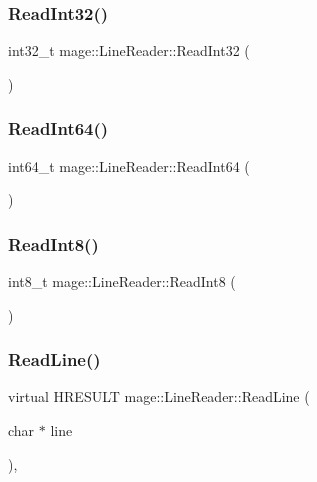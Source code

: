 \subsubsection{\texorpdfstring{Read\+Int32()}{ReadInt32()}}
{\footnotesize\ttfamily int32\+\_\+t mage\+::\+Line\+Reader\+::\+Read\+Int32 (\begin{DoxyParamCaption}{ }\end{DoxyParamCaption})\hspace{0.3cm}{\ttfamily [protected]}}

\hypertarget{classmage_1_1_line_reader_af78e657c17cfff3bfc5fed42fbc47085}{}\label{classmage_1_1_line_reader_af78e657c17cfff3bfc5fed42fbc47085} 
\subsubsection{\texorpdfstring{Read\+Int64()}{ReadInt64()}}
{\footnotesize\ttfamily int64\+\_\+t mage\+::\+Line\+Reader\+::\+Read\+Int64 (\begin{DoxyParamCaption}{ }\end{DoxyParamCaption})\hspace{0.3cm}{\ttfamily [protected]}}

\hypertarget{classmage_1_1_line_reader_a3b88ec3a8555d79b25c2a8818a26f124}{}\label{classmage_1_1_line_reader_a3b88ec3a8555d79b25c2a8818a26f124} 
\subsubsection{\texorpdfstring{Read\+Int8()}{ReadInt8()}}
{\footnotesize\ttfamily int8\+\_\+t mage\+::\+Line\+Reader\+::\+Read\+Int8 (\begin{DoxyParamCaption}{ }\end{DoxyParamCaption})\hspace{0.3cm}{\ttfamily [protected]}}

\hypertarget{classmage_1_1_line_reader_a193ad5c9084eb87e8a98a3c1782d93ff}{}\label{classmage_1_1_line_reader_a193ad5c9084eb87e8a98a3c1782d93ff} 
\subsubsection{\texorpdfstring{Read\+Line()}{ReadLine()}}
{\footnotesize\ttfamily virtual H\+R\+E\+S\+U\+LT mage\+::\+Line\+Reader\+::\+Read\+Line (\begin{DoxyParamCaption}\item[{char $\ast$}]{line }\end{DoxyParamCaption})\hspace{0.3cm}{\ttfamily [protected]}, {}}




